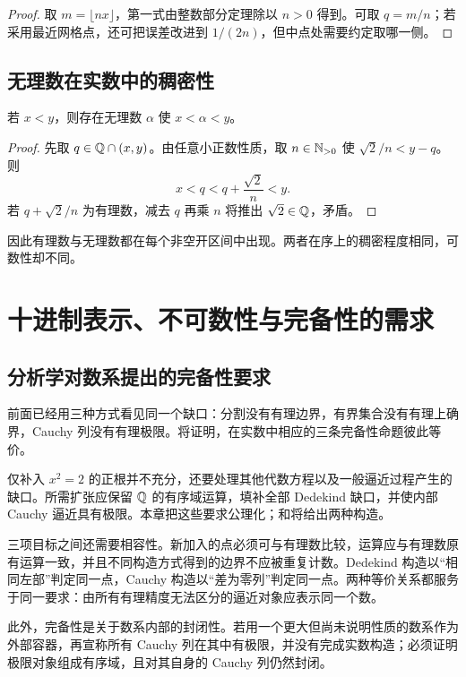 \begin{proof}
取 \(m=\lfloor nx\rfloor\)，第一式由整数部分定理除以 \(n>0\) 得到。可取 \(q=m/n\)；若采用最近网格点，还可把误差改进到 \(1/(2n)\)，但中点处需要约定取哪一侧。
\end{proof}

\subsection{无理数在实数中的稠密性}


\begin{theorem}
若 \(x<y\)，则存在无理数 \(\alpha\) 使 \(x<\alpha<y\)。
\end{theorem}

\begin{proof}
先取 \(q\in\mathbb{Q}\cap(x,y)\)。由任意小正数性质，取 \(n\in\mathbb{N}_{>0}\) 使 \(\sqrt2/n<y-q\)。则
\[
 x<q<q+\frac{\sqrt2}{n}<y.
\]
若 \(q+\sqrt2/n\) 为有理数，减去 \(q\) 再乘 \(n\) 将推出 \(\sqrt2\in\mathbb{Q}\)，矛盾。
\end{proof}

因此有理数与无理数都在每个非空开区间中出现。两者在序上的稠密程度相同，可数性却不同。

\section{十进制表示、不可数性与完备性的需求}

\subsection{分析学对数系提出的完备性要求}


前面已经用三种方式看见同一个缺口：分割没有有理边界，有界集合没有有理上确界，Cauchy 列没有有理极限。将证明，在实数中相应的三条完备性命题彼此等价。

仅补入 \(x^2=2\) 的正根并不充分，还要处理其他代数方程以及一般逼近过程产生的缺口。所需扩张应保留 \(\mathbb{Q}\) 的有序域运算，填补全部 Dedekind 缺口，并使内部 Cauchy 逼近具有极限。本章把这些要求公理化；和将给出两种构造。

三项目标之间还需要相容性。新加入的点必须可与有理数比较，运算应与有理数原有运算一致，并且不同构造方式得到的边界不应被重复计数。Dedekind 构造以“相同左部”判定同一点，Cauchy 构造以“差为零列”判定同一点。两种等价关系都服务于同一要求：由所有有理精度无法区分的逼近对象应表示同一个数。

此外，完备性是关于数系内部的封闭性。若用一个更大但尚未说明性质的数系作为外部容器，再宣称所有 Cauchy 列在其中有极限，并没有完成实数构造；必须证明极限对象组成有序域，且对其自身的 Cauchy 列仍然封闭。

